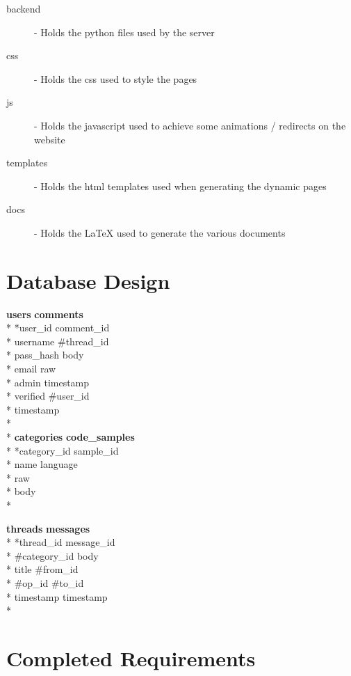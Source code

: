 \documentclass[12pt]{scrartcl}
\begin{document}
\begin{description}
\item [backend] - Holds the python files used by the server
\item [css] - Holds the css used to style the pages
\item [js] - Holds the javascript used to achieve some animations / redirects on the website
\item [templates] - Holds the html templates used when generating the dynamic pages
\item [docs] - Holds the LaTeX used to generate the various documents
\end{description}

\section{Database Design}

\textbf{users} \hfill \textbf{comments}\\*
*user\_id \hfill *comment\_id\\*
username \hfill \#thread\_id\\*
pass\_hash \hfill body\\*
email \hfill raw\\*
admin \hfill timestamp\\*
verified \hfill \#user\_id\\*
timestamp \\*
\\*
\textbf{categories} \hfill \textbf{code\_samples}\\*
*category\_id \hfill *sample\_id\\*
name \hfill language\\*
\hfill raw\\*
\hfill body\\*

\textbf{threads} \hfill \textbf{messages}\\*
*thread\_id \hfill *message\_id\\*
\#category\_id \hfill body\\*
title \hfill \#from\_id\\*
\#op\_id \hfill \#to\_id\\*
timestamp \hfill timestamp\\*

\section{Completed Requirements}
\end{document}
